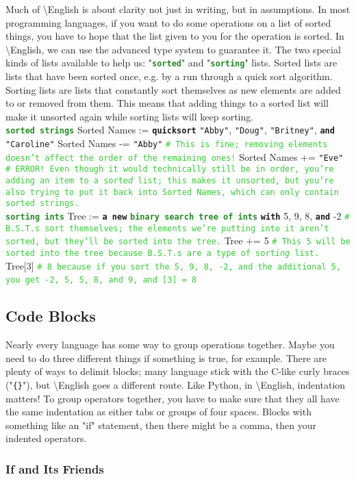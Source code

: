 \documentclass{article}
\newcommand{\English}{\textbackslash{}English}				%
\newcommand{\ssecl}[1]{\subsection{#1}\label{ssec:#1}}
\newcommand{\sssecl}[1]{\subsubsection{#1}\label{sssec:#1}}
\newcommand{\codecomment}[1]{\texttt{\textcolor{LimeGreen}{#1}}}
\newcommand{\commentline}[1]{\codecomment{\# #1}}
\newcommand{\type}[1]{\texttt{\textcolor{ForestGreen}{\textbf{#1}}}}
\newcommand{\common}[1]{\texttt{\textcolor{Mulberry}{\textbf{#1}}}}
\newcommand{\codestring}[1]{\texttt{\textcolor{NavyBlue}{"#1"}}}
\newenvironment{code}[0]
{\ttfamily{}				%
\setlength\parindent{0cm}	%
~\\}
{\setlength\parindent{1cm}
~\\}
\begin{document}
\indent Much of \English{} is about clarity not just in writing, but in assumptions. In most programming languages, if you want to do some operations on a list of sorted things, you have to hope that the list given to you for the operation is sorted. In \English{}, we can use the advanced type system to guarantee it.
\indent The two special kinds of lists available to help us: "\type{sorted}" and "\type{sorting}" lists. Sorted lists are lists that have been sorted once, e.g. by a run through a quick sort algorithm. Sorting lists are lists that constantly sort themselves as new elements are added to or removed from them. This means that adding things to a sorted list will make it unsorted again while sorting lists will keep sorting.
\begin{code}
\type{sorted strings} Sorted Names := \common{quicksort} \codestring{Abby}, \codestring{Doug}, \codestring{Britney}, \common{and} \codestring{Caroline}
Sorted Names -= \codestring{Abby} \commentline{This is fine; removing elements doesn't affect the order of the remaining ones!}
Sorted Names += \codestring{Eve} \commentline{ERROR! Even though it would technically still be in order, you're adding an item to a sort\emph{ed} list; this makes it unsorted, but you're also trying to put it back into Sorted Names, which can only contain sorted strings.}\\

\type{sorting ints} Tree := \common{a new} \type{binary search tree of ints} \common{with} 5, 9, 8, \common{and} -2 \commentline{B.S.T.s sort themselves; the elements we're putting into it aren't sorted, but they'll be sorted into the tree.}
Tree += 5 \commentline{This 5 will be sorted into the tree because B.S.T.s are a type of sort\emph{ing} list.}
Tree[3] \commentline{8 because if you sort the 5, 9, 8, -2, and the additional 5, you get -2, 5, 5, 8, and 9, and [3] = 8}
\end{code}

\ssecl{Code Blocks}
\indent Nearly every language has some way to group operations together. Maybe you need to do three different things if something is true, for example. There are plenty of ways to delimit blocks; many language stick with the C-like curly braces ("\texttt{\{\}}"), but \English{} goes a different route. Like Python, in \English{}, indentation matters! To group operators together, you have to make sure that they all have the same indentation as either tabs or groups of four spaces. Blocks with something like an "if" statement, then there might be a comma, then your indented operators.
\sssecl{If and Its Friends}
\end{document}
